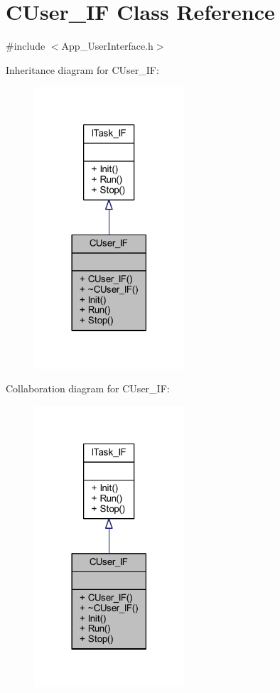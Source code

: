 \hypertarget{class_c_user___i_f}{}\section{C\+User\+\_\+\+IF Class Reference}
\label{class_c_user___i_f}


{\ttfamily \#include $<$App\+\_\+\+User\+Interface.\+h$>$}



Inheritance diagram for C\+User\+\_\+\+IF\+:
\nopagebreak
\begin{figure}[H]
\begin{center}
\leavevmode
\includegraphics[width=158pt]{class_c_user___i_f__inherit__graph}
\end{center}
\end{figure}


Collaboration diagram for C\+User\+\_\+\+IF\+:
\nopagebreak
\begin{figure}[H]
\begin{center}
\leavevmode
\includegraphics[width=158pt]{class_c_user___i_f__coll__graph}
\end{center}
\end{figure}
